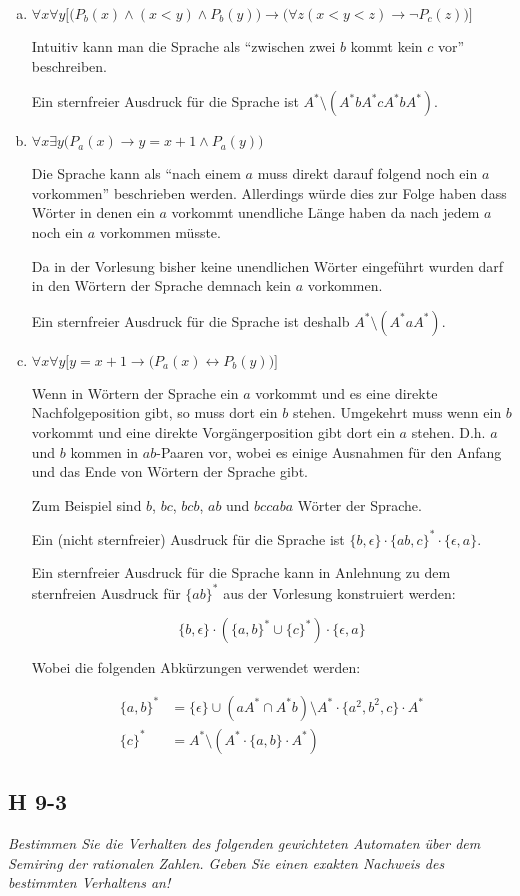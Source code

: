 \documentclass{scrartcl}
\begin{document}
\begin{enumerate}[(a)]
    \item $\forall x \forall y\Big[\big(P_b(x) \land (x < y) \land P_b(y)\big) \rightarrow \big(\forall z (x < y < z) \rightarrow \lnot P_c(z)\big)\Big]$

      Intuitiv kann man die Sprache als \enquote{zwischen zwei $b$ kommt kein $c$ vor} beschreiben.

      Ein sternfreier Ausdruck für die Sprache ist $A^* \setminus (A^* b A^* c A^* b A^*)$.

    \item $\forall x \exists y \Big( P_a(x) \rightarrow y = x+1 \land P_a(y)\Big)$

      Die Sprache kann als \enquote{nach einem $a$ muss direkt darauf folgend noch ein $a$ vorkommen} beschrieben werden. Allerdings würde dies zur Folge haben dass Wörter in denen ein $a$ vorkommt unendliche Länge haben da nach jedem $a$ noch ein $a$ vorkommen müsste.

      Da in der Vorlesung bisher keine unendlichen Wörter eingeführt wurden darf in den Wörtern der Sprache demnach kein $a$ vorkommen.

      Ein sternfreier Ausdruck für die Sprache ist deshalb $A^* \setminus (A^* a A^*)$.
    \item $\forall x \forall y \Big[ y = x+1 \rightarrow \big(P_a(x) \leftrightarrow P_b(y)\big)\Big]$

      Wenn in Wörtern der Sprache ein $a$ vorkommt und es eine direkte Nachfolgeposition gibt, so muss dort ein $b$ stehen. Umgekehrt muss wenn ein $b$ vorkommt und eine direkte Vorgängerposition gibt dort ein $a$ stehen. D.h. $a$ und $b$ kommen in $ab$-Paaren vor, wobei es einige Ausnahmen für den Anfang und das Ende von Wörtern der Sprache gibt.

      Zum Beispiel sind $b$, $bc$, $bcb$, $ab$ und $bccaba$ Wörter der Sprache.

      Ein (nicht sternfreier) Ausdruck für die Sprache ist $\{b, \epsilon\} \cdot \{ab,c\}^* \cdot \{\epsilon, a\}$.

      Ein sternfreier Ausdruck für die Sprache kann in Anlehnung zu dem sternfreien Ausdruck für $\{ab\}^*$ aus der Vorlesung konstruiert werden:

      \begin{equation*}
        \{b, \epsilon\} \cdot (\{a,b\}^* \cup \{c\}^*) \cdot \{\epsilon, a\}
      \end{equation*}

      Wobei die folgenden Abkürzungen verwendet werden:

      \begin{align*}
        \{a,b\}^* &= \{\epsilon\} \cup (aA^* \cap A^*b) \setminus A^* \cdot \{a^2, b^2, c\} \cdot A^*\\
        \{c\}^* &= A^* \setminus (A^* \cdot \{a, b\} \cdot A^*)
      \end{align*}
\end{enumerate}

\subsection{H 9-3}

\textsl{Bestimmen Sie die Verhalten des folgenden gewichteten Automaten über dem \emph{Semiring der rationalen Zahlen}. Geben Sie einen exakten Nachweis des bestimmten Verhaltens an!}
\end{document}
